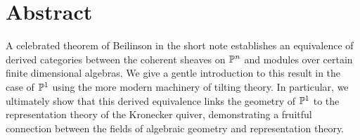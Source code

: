 \chapter*{Abstract}

A celebrated theorem of Beilinson in the short note \cite{beilinson}
establishes an equivalence of derived categories between the coherent
sheaves on $\mathbb{P}^{{n}}$ and modules over certain finite dimensional algebras.
We give a gentle introduction to this result in the case of
$\mathbb{P}^{{1}}$ using the more modern machinery of tilting theory.
In particular, we ultimately show that this derived equivalence links
the geometry of $\mathbb{P}^{{1}}$ to the representation theory of the
Kronecker quiver, demonstrating a fruitful connection between the
fields of algebraic geometry and representation theory.

